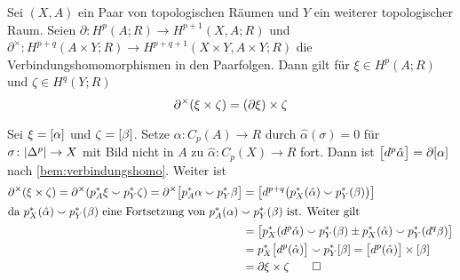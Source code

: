 \begin{lemma}[label=sec3:lem1,{name=[Randabbildungen und Kreuz-Produkt]}]
	Sei $(X,A)$ ein Paar von topologischen Räumen und $Y$ ein weiterer topologischer Raum. Seien $\partial \colon H^p(A;R) \to H^{p+1}(X,A;R)$ und 
	$\partial^{\times} \colon H^{p+q}(A \times Y;R) \to H^{p+q+1}(X\times Y,A \times Y;R)$ die Verbindungshomomorphismen in den Paarfolgen. Dann gilt für $\xi \in H^p(A;R)$
	und $\zeta \in H^q(Y;R)$
	\[
		\partial^\times (\xi \times \zeta) = \enbrace*{\partial \xi} \times \zeta
	\]
\end{lemma}
\begin{beweis}
	Sei $\xi= \benbrace*{\alpha}$ und $\zeta= \benbrace*{\beta}$. Setze $\alpha \colon C_p(A) \to R$ durch $\hat{\alpha}(\sigma)=0$ für $\sigma \colon \abs{\Delta^p} \to X$
	mit Bild nicht in $A$ zu $\hat{\alpha} \colon C_p(X) \to R$ fort. Dann ist
	\(
		\benbrace[\big]{d^p \hat{\alpha}}= \partial \benbrace*{\alpha}
	\)
	nach \autoref{bem:verbindungshomo}.
	Weiter ist 
	\begin{align}
		\partial^\times(\xi \times \zeta)= \partial^\times \enbrace*{p_A^* \xi \cupp p_Y^* \zeta} = \partial^\times \benbrace[\big]{p_A^* \alpha \cupp p_Y^* \beta} &= 
		\benbrace[\big]{d^{p+q} \enbrace[\big]{p^*_X (\hat{\alpha}) \cupp p^*_Y(\beta)}} \\
		\shortintertext{da $p^*_X(\hat{\alpha}) \cupp p_Y^*(\beta)$ eine Fortsetzung von $p_A^* (\alpha) \cupp p_Y^*(\beta)$ ist. Weiter gilt}
		&= \benbrace[\big]{p_X^* \enbrace*{d^p\hat{\alpha}} \cupp p_Y^*(\beta) \pm p_X^*(\hat{\alpha}) \cupp p_Y^* \enbrace*{d^q \beta}} \\
		&= p_X^* \benbrace[\big]{d^p(\hat{\alpha})} \cupp p_Y^* \benbrace*{\beta} = \benbrace[\big]{d^p(\hat{\alpha})} \times \benbrace*{\beta} \\ 
		&= \partial \xi \times \zeta \qedhere
	\end{align}
\end{beweis}

